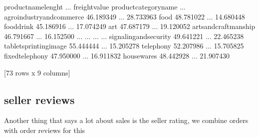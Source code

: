 \documentclass[letterpaper,10pt,english]{jupyterBook}
\begin{document}
\begin{sphinxVerbatim}[commandchars=\\\{\}]
                            product\PYGZus{}name\PYGZus{}lenght  ...  freight\PYGZus{}value
product\PYGZus{}category\PYGZus{}name                            ...               
agro\PYGZus{}industry\PYGZus{}and\PYGZus{}commerce            46.189349  ...      28.733963
food                                  48.781022  ...      14.680448
food\PYGZus{}drink                            45.186916  ...      17.074249
art                                   47.687179  ...      19.120052
arts\PYGZus{}and\PYGZus{}craftmanship                 46.791667  ...      16.152500
...                                         ...  ...            ...
signaling\PYGZus{}and\PYGZus{}security                49.641221  ...      22.465238
tablets\PYGZus{}printing\PYGZus{}image                55.444444  ...      15.205278
telephony                             52.207986  ...      15.705825
fixed\PYGZus{}telephony                       47.950000  ...      16.911832
housewares                            48.442928  ...      21.907430

[73 rows x 9 columns]
\end{sphinxVerbatim}


\subsection{seller reviews}
\label{\detokenize{c7_case_studies/Olist:seller-reviews}}
\sphinxAtStartPar
Another thing that says a lot about sales is the seller rating, we combine orders with order reviews for this

\begin{sphinxVerbatim}[commandchars=\\\{\}]
  
\end{sphinxVerbatim}
\end{document}
